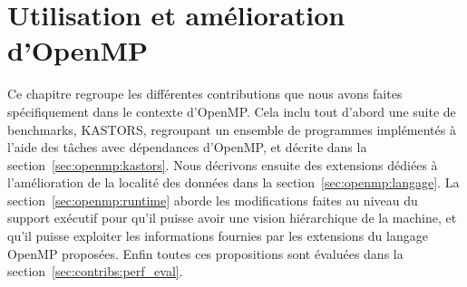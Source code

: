 

\chapter{Utilisation et amélioration d'OpenMP}\label{chap:contrib:openmp}
\chaptertoc


%




Ce chapitre regroupe les différentes contributions que nous avons faites spécifiquement dans le contexte d'OpenMP.
Cela inclu tout d'abord une suite de benchmarks, KASTORS, regroupant un ensemble de programmes implémentés à l'aide des tâches avec dépendances d'OpenMP, et décrite dans la section~\ref{sec:openmp:kastors}.
Nous décrivons ensuite des extensions dédiées à l'amélioration de la localité des données dans la section~\ref{sec:openmp:langage}.
La section~\ref{sec:openmp:runtime} aborde les modifications faites au niveau du support exécutif pour qu'il puisse avoir une vision hiérarchique de la machine, et qu'il puisse exploiter les informations fournies par les extensions du langage OpenMP proposées.
Enfin toutes ces propositions sont évaluées dans la section~\ref{sec:contribs:perf_eval}.






